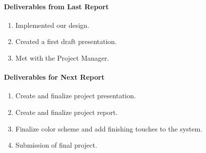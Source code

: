 \documentclass[12pt,oneside]{article}
\begin{document}
\paragraph{Deliverables from Last Report}
\begin{enumerate}
    \item Implemented our design.
    \item Created a first draft presentation.
    \item Met with the Project Manager.
\end{enumerate}

\paragraph{Deliverables for Next Report}
\begin{enumerate}
    \item Create and finalize project presentation.
    \item Create and finalize project report.
    \item Finalize color scheme and add finishing touches to the system.
    \item Submission of final project.
\end{enumerate}

\singlespace

%
\end{document}
